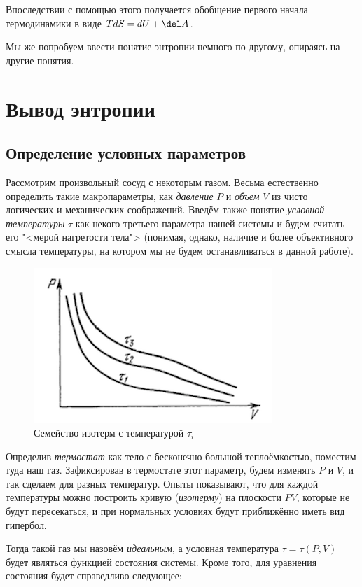 \documentclass[12pt]{kiarticle}
\begin{document}
Впоследствии с помощью этого получается обобщение первого начала термодинамики в виде $ TdS = dU + \del A $. 

Мы же попробуем ввести понятие энтропии немного по-другому, опираясь на другие понятия.

\section{Вывод энтропии}

\subsection{Определение условных параметров} \label{ifTS}

Рассмотрим произвольный сосуд с некоторым газом. Весьма естественно определить такие макропараметры, как \textit{давление} $ P $ и \textit{объем} $ V $ из чисто логических и механических соображений. Введём также понятие \textit{условной температуры} $ \tau $ как некого третьего параметра нашей системы и будем считать его "<мерой нагретости тела"> (понимая, однако, наличие и более объективного смысла температуры, на котором мы не будем останавливаться в данной работе). 

\begin{figure} 
	\includegraphics{tempdef}
	\caption{Семейство изотерм с температурой $ \tau_i $}
\end{figure}

Определив \textit{термостат} как тело с бесконечно большой теплоёмкостью, поместим туда наш газ. Зафиксировав в термостате этот параметр, будем изменять $ P $ и $ V $, и так сделаем для разных температур. Опыты показывают, что для каждой температуры можно построить кривую (\textit{изотерму}) на плоскости $ PV $, которые не будут пересекаться, и при нормальных условиях будут приближённо иметь вид гипербол. 

Тогда такой газ мы назовём \textit{идеальным}, а условная температура $ \tau = \tau (P, V) $ будет являться функцией состояния системы. Кроме того, для уравнения состояния будет справедливо следующее:
\end{document}
